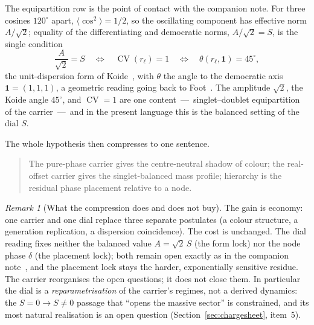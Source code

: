 \documentclass[11pt]{article}
\theoremstyle{definition}
\theoremstyle{remark}
\newtheorem{remark}{Remark}
\newcommand{\CV}{\operatorname{CV}}
\newcommand{\rl}{r_{\ell}}
\begin{document}
    The equipartition row is the point of contact with the companion note.
    For three cosines $120^\circ$ apart, $\langle \cos^2 \rangle = 1/2$, so the oscillating component has effective
    norm $A/\sqrt2$; equality of the differentiating and democratic norms, $A/\sqrt2 = S$, is the single condition
    \begin{equation}
      \label{eq:equipartition}
      \frac{A}{\sqrt2} = S
      \quad\Longleftrightarrow\quad
      \CV(\rl) = 1
      \quad\Longleftrightarrow\quad
      \theta(\rl, \mathbf 1) = 45^\circ,
    \end{equation}
    the unit-dispersion form of Koide~\cite{Beau2026kud}, with $\theta$ the angle to the democratic axis
    $\mathbf 1 = (1,1,1)$, a geometric reading going back to Foot~\cite{Foot1994}.
    The amplitude $\sqrt2$, the Koide angle $45^\circ$, and $\CV = 1$ are one content~---~singlet--doublet
    equipartition of the carrier~---~and in the present language this is the balanced setting of the dial $S$.

    The whole hypothesis then compresses to one sentence.

    \begin{quote}
      The pure-phase carrier gives the centre-neutral shadow of colour; the real-offset carrier gives the
      singlet-balanced mass profile; hierarchy is the residual phase placement relative to a node.
    \end{quote}

    \begin{remark}[What the compression does and does not buy]
      \label{rem:compress}
      The gain is economy: one carrier and one dial replace three separate postulates (a colour structure, a
      generation replication, a dispersion coincidence).
      The cost is unchanged.
      The dial reading fixes neither the balanced value $A = \sqrt2\,S$ (the form lock) nor the node phase $\delta$
      (the placement lock); both remain open exactly as in the companion note~\cite{Beau2026kud}, and the placement
      lock stays the harder, exponentially sensitive residue.
      The carrier reorganises the open questions; it does not close them.
      In particular the dial is a \emph{reparametrisation} of the carrier's regimes, not a derived dynamics: the
      $S = 0 \to S \neq 0$ passage that ``opens the massive sector'' is constrained, and its most natural
      realisation is an open question (Section~\ref{sec:chargesheet}, item~5).
    \end{remark}
\end{document}
